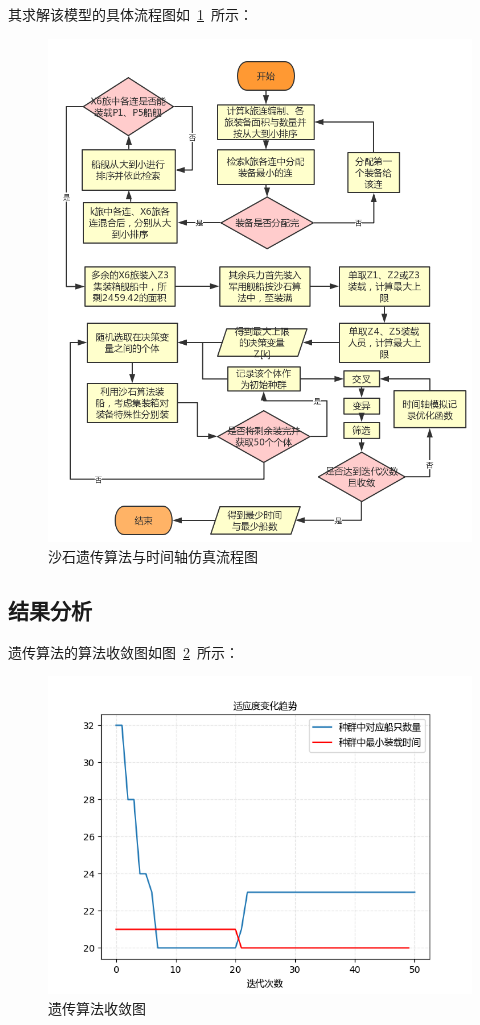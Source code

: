 \documentclass{whutmod}
\begin{document}
    	 
    	 其求解该模型的具体流程图如~\ref{dierwen}~所示：
    \begin{figure}[H]
    	\centering
    	\includegraphics[width=\textwidth]{figures/dierwen.png}
    	\caption{沙石遗传算法与时间轴仿真流程图}\label{dierwen}
    \end{figure}
     
     	\subsection{结果分析}
     	遗传算法的算法收敛图如图~\ref{sdsd}~所示：
     	    \begin{figure}[H]
     		\centering
     		\includegraphics[width=.7\textwidth]{figures/shou1.png}
     		\caption{遗传算法收敛图}\label{sdsd}
     	\end{figure}
     	
\end{document}
